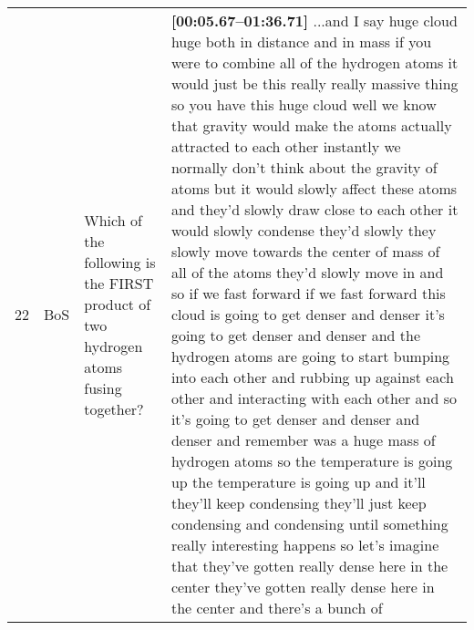 \documentclass[10pt]{article}
\begin{document}
\begin{tiny}
\begin{longtable}{|r|p{0.375in}|p{1.275in}|p{3.5in}|}
22 &          BoS &                                                                                                                                                                                               Which of the following is the FIRST product of two hydrogen atoms fusing together? &                                                                                                                                                                                                                                                                                                                                                                                                                                                                                                                                                                                                                                                                                                                                                                                                                                                                                                                                                                                                                                                                                                                                                                                                                                                                                                                                                                                                                                                                                                                                                                                                                                                                                                                                                                                                \textbf{[00:05.67--01:36.71]} ...and I say huge cloud huge both in distance and in mass if you were to combine all of the hydrogen atoms it would just be this really really massive thing so you have this huge cloud well we know that gravity would make the atoms actually attracted to each other instantly we normally don't think about the gravity of atoms but it would slowly affect these atoms and they'd slowly draw close to each other it would slowly condense they'd slowly they slowly move towards the center of mass of all of the atoms they'd slowly move in and so if we fast forward if we fast forward this cloud is going to get denser and denser it's going to get denser and denser and the hydrogen atoms are going to start bumping into each other and rubbing up against each other and interacting with each other and so it's going to get denser and denser and denser and remember was a huge mass of hydrogen atoms so the temperature is going up the temperature is going up and it'll they'll keep condensing they'll just keep condensing and condensing until something really interesting happens so let's imagine that they've gotten really dense here in the center they've gotten really dense here in the center and there's a bunch of 
\end{longtable}
\end{tiny}
\end{document}
